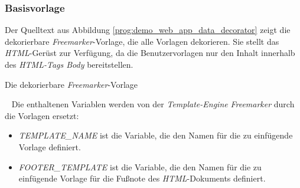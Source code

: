 \subsubsection{Basisvorlage}
Der Quelltext aus Abbildung \ref{prog:demo_web_app_data_decorator} zeigt die dekorierbare \emph{Freemarker}-Vorlage, die alle Vorlagen dekorieren. Sie stellt das \emph{HTML}-Gerüst zur Verfügung, da die Benutzervorlagen nur den Inhalt innerhalb des \emph{HTML-Tags Body} bereitstellen.
\begin{program}[h]
\caption{Die dekorierbare \emph{Freemarker}-Vorlage}
\label{prog:demo_web_app_data_decorator}
\end{program}
\ \newline
Die enthaltenen Variablen werden von der \emph{Template-Engine} \emph{Freemarker} durch die Vorlagen ersetzt:
\begin{itemize}
	\item\emph{TEMPLATE\_NAME}
	\newline
	ist die Variable, die den Namen für die zu einfügende Vorlage definiert.
	\item\emph{FOOTER\_TEMPLATE}
	\newline
	ist die Variable, die den Namen für die zu einfügende Vorlage für die Fußnote des \emph{HTML}-Dokuments definiert.
\end{itemize}

